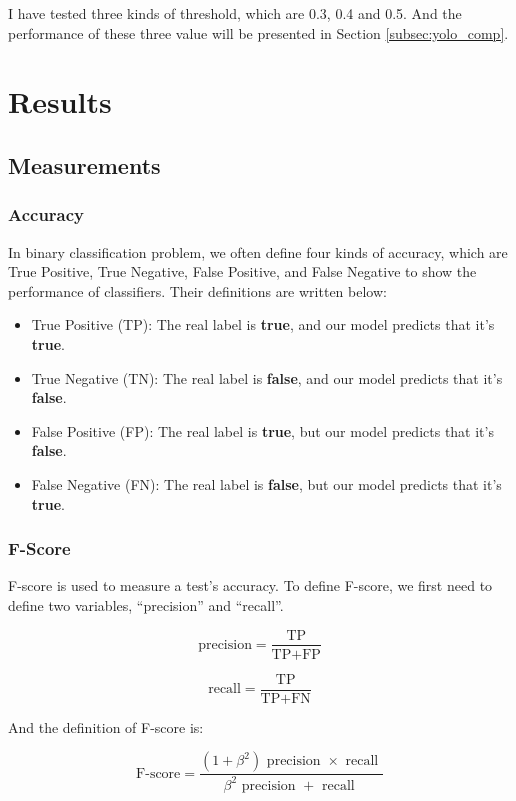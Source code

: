 \documentclass{article}[12pt]
\begin{document}
I have tested three kinds of threshold, which are 0.3, 0.4 and 0.5. And the performance of these
three value will be presented in Section \ref{subsec:yolo_comp}.

\section{Results} \label{sec:res}
\subsection{Measurements}
\subsubsection{Accuracy}
In binary classification problem, we often define four kinds of accuracy, 
which are True Positive, True Negative, False Positive, and False Negative 
to show the performance of classifiers. Their definitions are written below:
\begin{itemize}
    \item True Positive (TP): The real label is \textbf{true}, 
    and our model predicts that it's \textbf{true}.
    \item True Negative (TN): The real label is \textbf{false}, 
    and our model predicts that it's \textbf{false}.
    \item False Positive (FP): The real label is \textbf{true}, 
    but our model predicts that it's \textbf{false}.
    \item False Negative (FN): The real label is \textbf{false}, 
    but our model predicts that it's \textbf{true}.
\end{itemize}
\subsubsection{F-Score}
F-score is used to measure a test's accuracy. 
To define F-score, we first need to define two variables, 
``precision'' and ``recall''.

\begin{equation}
    \text {precision}=\frac{\text{TP}}{\text{TP}+\text{FP}}
\end{equation}

\begin{equation}
    \text {recall}=\frac{\text{TP}}{\text{TP}+\text{FN}}
\end{equation}

And the definition of F-score is:

\begin{equation}
    \text {F-score}=\frac{\left(1+\beta^{2}\right) \text { precision } \times \text { recall }}{\beta^{2} \text { precision }+\text { recall }}
\end{equation}
\end{document}
